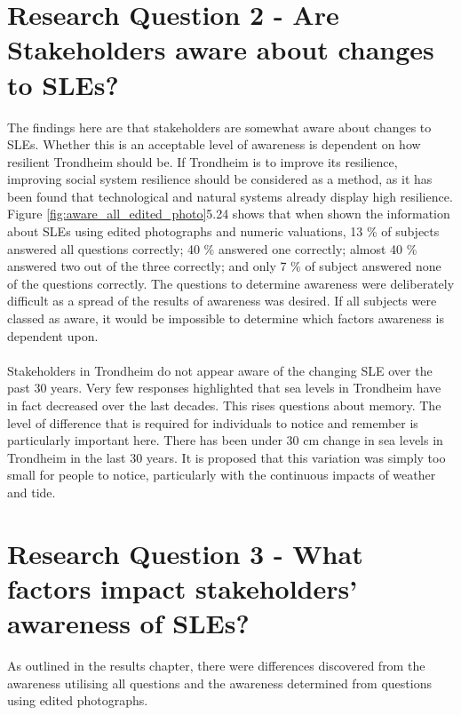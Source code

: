 \section{Research Question 2 - Are Stakeholders aware about changes to SLEs?} \label{RQ2 - findings}

The findings here are that stakeholders are somewhat aware about changes to SLEs. Whether this is an acceptable level of awareness is dependent on how resilient Trondheim should be. If Trondheim is to improve its resilience, improving social system resilience should be considered as a method, as it has been found that technological and natural systems already display high resilience. Figure \ref{fig:aware_all_edited_photo}5.24 shows that when shown the information about SLEs using edited photographs and numeric valuations, 13 \% of subjects answered all questions correctly; 40 \% answered one correctly; almost 40 \% answered two out of the three correctly; and only 7 \% of subject answered none of the questions correctly. The questions to determine awareness were deliberately difficult as a spread of the results of awareness was desired. If all subjects were classed as aware, it would be impossible to determine which factors awareness is dependent upon. 
\paragraph{}
Stakeholders in Trondheim do not appear aware of the changing SLE over the past 30 years. Very few responses highlighted that sea levels in Trondheim have in fact decreased over the last decades. This rises questions about memory. The level of difference that is required for individuals to notice and remember is particularly important here. There has been under 30 cm change in sea levels in Trondheim in the last 30 years. It is proposed that this variation was simply too small for people to notice, particularly with the continuous impacts of weather and tide. 
\paragraph{}

\section{Research Question 3 - What factors impact stakeholders' awareness of SLEs? } \label{RQ3 - finding}
 As outlined in the results chapter, there were differences discovered from the awareness utilising all questions and the awareness determined from questions using edited photographs. 
